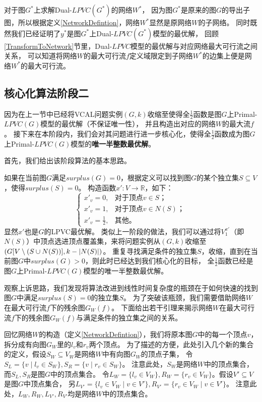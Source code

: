 对于图$G^*$上求解Dual-$LPVC(G^*)$的网络$W^*$，
因为图$G^*$是原来的图$G$的导出子图，所以根据定义\ref{NetworkDefintion}，网络$W^*$显然是原网络$W$的子网络。
同时既然我们已经证明了$y^*$是图$G^*$上Dual-$LPVC(G^*)$模型的最优解，
回顾\ref{TransformToNetwork}节里，Dual-$LPVC$模型的最优解与对应网络最大可行流之间关系，
可以知道将网络$W$的最大可行流$f$定义域限定到子网络$W^*$的边集上便是网络$W^*$的最大可行流。

\subsection{核心化算法阶段二}
因为在上一节中已经将VCAL问题实例$(G, k)$收缩至使得全$\frac{1}{2}$函数是图$G$上Primal-$LPVC(G)$模型的最优解（不保证唯一性），
并且构造出对应的网络$W$的最大流$f$。
接下来在本阶段内，我们会对其问题进行进一步核心化，使得全$\frac{1}{2}$函数成为图$G$上Primal-$LPVC(G)$模型的\textbf{唯一半整数最优解}。
\vspace{0.5cm}

首先，我们给出该阶段算法的基本思路。

如果在当前图$G$满足$surplus(G) = 0$，根据定义可以找到图$G$的某个独立集$S \subseteq V$，使得$surplus(S) = 0$。
构造函数$x':V \rightarrow \mathbb{R}$，如下：
\begin{equation*}
   \begin{cases}
            x'_v =0, & \mbox{对于顶点$v \in S$；}  \\
            x'_v =1, & \mbox{对于顶点$v \in N(S)$；}  \\
            x'_v =\frac{1}{2}, & \mbox{其他。}
          \end{cases}
\end{equation*}
显然$x'$也是$G$的LPVC最优解。
类似上一阶段的做法，我们可以通过将$V^{x'}_1$（即$N(S)$）中顶点选进顶点覆盖集，来将问题实例从$(G,k)$收缩至$(G[V\setminus(S \cup N(S))], k - \left\vert N(S) \right\vert)$。
重复寻找满足条件的独立集$S$，收缩，直到在当前图$G$中$surplus(G) > 0$，则此时已经达到我们核心化的目标，
全$\frac{1}{2}$函数已经是图$G$上Primal-$LPVC(G)$模型的唯一半整数最优解。

观察上诉思路，我们发现将算法改进到线性时间复杂度的瓶颈在于如何快速的找到图$G$中满足$surplus(S) = 0$的独立集$S$。
为了突破该瓶颈，我们需要借助网络$W$在最大可行流$f$下的残余图$G_W(f)$。
下面给出若干引理来揭示网络$W$在最大可行流$f$下的残余图$G_W(f)$与满足条件的独立集之间的关系。

回忆网络$W$的构造（定义\ref{NetworkDefintion}），我们将原本图$G$中的每一个顶点$v$，拆分成有向图$G_W$里的$l_v$和$r_v$两个顶点。
为了描述的方便，此处引入几个新的集合的定义，假设$S_W \subseteq V_W$是网络$W$中有向图$G_W$的顶点子集，
令$S_L = \{v\;|\;l_v \in S_W\},S_R = \{v\;|\;r_v \in S_W\}$。
注意此处，$S_W$是网络$W$中的顶点集合，而$S_L, S_R$是图$G$中的顶点集合。
令$L_W = \{l_v \in V_W\}, R_W = \{r_v \in V_W\}$。假设$V' \subseteq V$是图$G$中顶点集合，
另$L_{V'} = \{l_v\in V_W\;|\;v \in V'\},R_{V'} = \{r_v\in V_W\;|\;v \in V'\}$。
注意此处，$L_W, R_W, L_{V'}, R_{V'}$均是网络$W$中的顶点集合。

